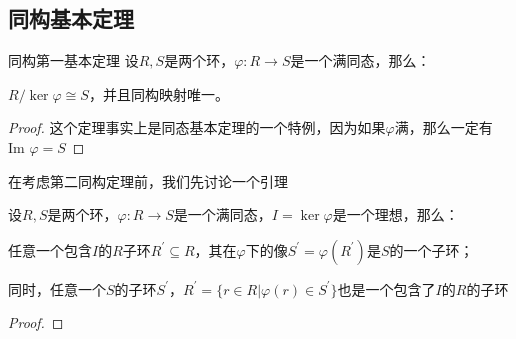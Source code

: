 \documentclass[12pt, a4paper, oneside, UTF8]{ctexbook}
\begin{document}
		\subsection{同构基本定理}
			\begin{them}{同构第一基本定理}{}
				设$R,S$是两个环，$\varphi : R \rightarrow S$是一个满同态，那么：

				$R / \ker \varphi \cong S $，并且同构映射唯一。
			\end{them}
			\begin{proof}
				这个定理事实上是同态基本定理的一个特例，因为如果$\varphi $满，那么一定有$\text{Im }\varphi = S$
			\end{proof}
			在考虑第二同构定理前，我们先讨论一个引理
			\begin{lemma}{}{}
				设$R,S$是两个环，$\varphi : R \rightarrow S$是一个满同态，$I=\ker \varphi$是一个理想，那么：

				任意一个包含$I$的$R$子环$R^{\prime} \subseteq R$，其在$\varphi $下的像$S^{\prime}=\varphi (R^{\prime})$是$S$的一个子环；

				同时，任意一个$S$的子环$S^{\prime}$，$R^{\prime}=\{r \in R| \varphi (r) \in S^{\prime}\}$也是一个包含了$I$的$R$的子环
			\end{lemma}
			\begin{proof}
				
			\end{proof}

\end{document}
